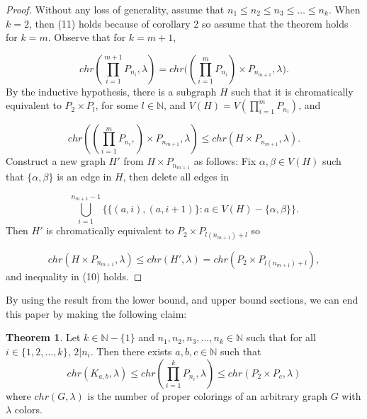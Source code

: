 \documentclass[11pt]{article}
\theoremstyle{definition}
\newcommand{\N}{{\mathbb{N}}}
\newtheorem*{thm*}{Theorem}
\begin{document}
\begin{proof}
Without any loss of generality, assume that $n_1 \leq n_2 \leq n_3 \leq \ldots \leq n_k$. When $k = 2$, then (11) holds because of corollary 2 so assume that the theorem holds for $k = m$. Observe that for $k = m + 1$,

\begin{equation}
chr(\prod_{i = 1}^{m + 1}P_{n_{i}}, \lambda) = chr\Big((\prod_{i = 1}^{m}P_{n_{i}}) \times P_{n_{m + 1}},\lambda \Big). \nonumber
\end{equation} By the inductive hypothesis, there is a subgraph $H$ such that it is chromatically equivalent to $P_2 \times P_{l}$, for some $l \in \N$, and $V(H) = V(\prod_{i = 1}^{m}P_{n_{i}})$, and

\begin{equation}
chr((\prod_{i = 1}^{m}P_{n_{i}},) \times P_{n_{m + 1}},\lambda) \leq chr(H \times P_{n_{m + 1}},\lambda). \nonumber
\end{equation} Construct a new graph $H'$ from $H \times P_{n_{m + 1}}$ as follows: Fix $\alpha,\beta \in V(H)$ such that $\{\alpha, \beta \}$ is an edge in $H$, then delete all edges in 

\begin{equation}
\bigcup_{i = 1}^{n_{m + 1} - 1} \{\{(a, i),(a, i + 1)\}: a \in V(H) - \{\alpha, \beta\}\}. \nonumber
\end{equation} Then $H'$ is chromatically equivalent to $P_2 \times P_{l(n_{m + 1}) + l}$ so 

\begin{equation}
chr(H \times P_{n_{m + 1}}, \lambda) \leq chr(H', \lambda) = chr(P_2 \times P_{l(n_{m + 1}) + l}), \nonumber
\end{equation} and inequality in (10) holds.
\end{proof}

By using the result from the lower bound, and upper bound sections, we can end this paper by making the following claim:

\begin{thm*}
Let $k \in \N - \{1\}$ and $n_1, n_2, n_3, \ldots, n_k \in \N$ such that for all $i \in \{1, 2, \ldots, k\}$, $2 | n_i$. Then there exists $a,b,c \in \N$ such that
\begin{equation}
chr(K_{a,b},\lambda) \leq chr(\prod_{i = 1}^{k}P_{n_{i}}, \lambda) \leq chr(P_{2} \times P_{c}, \lambda) \nonumber
\end{equation} where $chr(G,\lambda)$ is the number of proper colorings of an arbitrary graph $G$ with $\lambda$ colors.
\end{thm*}
\end{document}
